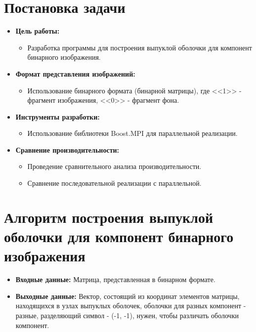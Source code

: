 \documentclass[12pt]{article}
\begin{document}
\section*{Постановка задачи}
\begin{itemize}
    \item \textbf{Цель работы:}
        \begin{itemize}
            \item Разработка программы для построения выпуклой оболочки для компонент бинарного изображения.
        \end{itemize}
    \item \textbf{Формат представления изображений:}
        \begin{itemize}
            \item Использование бинарного формата (бинарной матрицы), где <<1>> - фрагмент изображения, <<0>> - фрагмент фона.
        \end{itemize}
    \item \textbf{Инструменты разработки:}
        \begin{itemize}
             \item Использование библиотеки Boost.MPI для параллельной реализации.
        \end{itemize}
    \item \textbf{Сравнение производительности:}
         \begin{itemize}
            \item Проведение сравнительного анализа производительности.
            \item Сравнение последовательной реализации с параллельной.
         \end{itemize}
\end{itemize}
\newpage

\section*{Алгоритм построения выпуклой оболочки для компонент бинарного изображения}

\begin{itemize}
    \item[] \textbf{Входные данные:} Матрица, представленная в бинарном формате.
    \item[] \textbf{Выходные данные:} Вектор, состоящий из координат элементов матрицы, находящихся в узлах выпуклых оболочек, оболочки для разных компонент - разные, разделяющий символ - (-1, -1), нужен, чтобы различать оболочки компонент.
\end{itemize}
\end{document}

